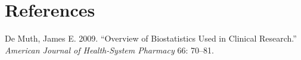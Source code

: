 \documentclass[
  letterpaper,
  DIV=11,
  numbers=noendperiod]{scrreprt}
\newlength{\cslhangindent}
\newlength{\cslentryspacingunit} %
\newenvironment{CSLReferences}[2] %
 {%
  \setlength{\parindent}{0pt}
  \ifodd #1
  \let\oldpar\par
  \def\par{\hangindent=\cslhangindent\oldpar}
  \fi
  \setlength{\parskip}{#2\cslentryspacingunit}
 }%
 {}
\begin{document}

\hypertarget{references}{%
\chapter*{References}\label{references}}

\hypertarget{refs}{}
\begin{CSLReferences}{1}{0}
\leavevmode{}%
De Muth, James E. 2009. {``Overview of Biostatistics Used in Clinical
Research.''} \emph{American Journal of Health-System Pharmacy} 66:
70--81.

\end{CSLReferences}
\end{document}
